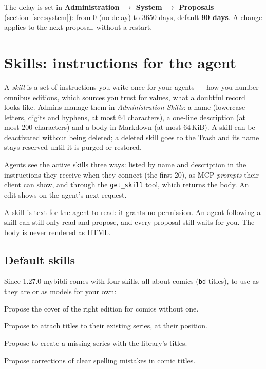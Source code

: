 The delay is set in \textbf{Administration \(\rightarrow\) System
\(\rightarrow\) Proposals}
(section~\ref{sec:system}): from 0 (no delay) to 3650 days, default
\textbf{90 days}. A change applies to the next proposal, without a
restart.

\section{Skills: instructions for the agent}
\label{sec:agents-skills}

A \emph{skill} is a set of instructions you write once for your
agents --- how you number omnibus editions, which sources you trust
for values, what a doubtful record looks like. Admins manage them in
\emph{Administration \textrightarrow{} Skills}: a name (lowercase
letters, digits and hyphens, at most 64 characters), a one-line
description (at most 200 characters) and a body in Markdown (at most
64\,KiB). A skill can be deactivated without being deleted; a deleted
skill goes to the Trash and its name stays reserved until it is purged
or restored.

Agents see the active skills three ways: listed by name and
description in the instructions they receive when they connect (the
first 20), as MCP \emph{prompts} their client can show, and through
the \texttt{get\_skill} tool, which returns the body. An edit shows
on the agent's next request.

\begin{note}
A skill is text for the agent to read: it grants no permission. An
agent following a skill can still only read and propose, and every
proposal still waits for you. The body is never rendered as HTML.
\end{note}

\subsection{Default skills}
\label{sec:agents-skills-defaults}

Since 1.27.0 mybibli comes with four skills, all about comics
(\texttt{bd} titles), to use as they are or as models for your own:

\begin{description}[style=nextline]
  \item[\texttt{comics-covers}] Propose the cover of the right edition
        for comics without one.
  \item[\texttt{comics-series-attach}] Propose to attach titles to
        their existing series, at their position.
  \item[\texttt{comics-series-create}] Propose to create a missing
        series with the library's titles.
  \item[\texttt{comics-title-spelling}] Propose corrections of clear
        spelling mistakes in comic titles.
\end{description}

